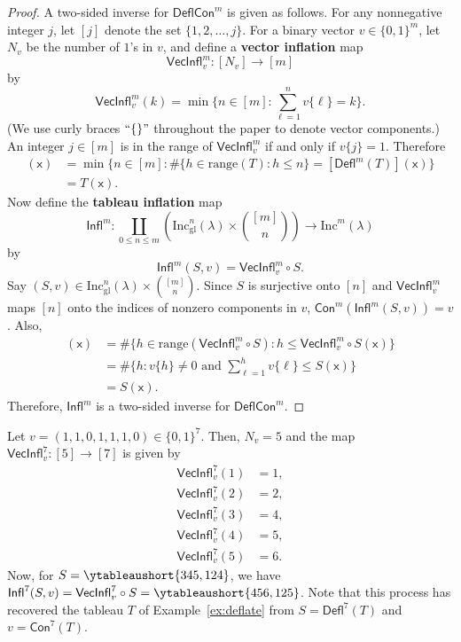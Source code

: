 \documentclass[12pt]{amsart}
\newcommand{\x}{\ensuremath{\mathsf{x}}}
\theoremstyle{definition}
\newenvironment{example}
  {\pushQED{\qed}\renewcommand{\qedsymbol}{$\diamondsuit$}\examplex}
  {\popQED\endexamplex}
\theoremstyle{remark}
\numberwithin{equation}{section}
\newcommand{\inc}{\ensuremath{\mathrm{Inc}}}
\newcommand{\incgl}{\inc_{\mathrm{gl}}}
\newcommand{\deflate}{\ensuremath{\mathsf{Defl}}}
\newcommand{\inflate}{\ensuremath{\mathsf{VecInfl}}}
\newcommand{\tinflate}{\ensuremath{\mathsf{Infl}}}
\newcommand{\content}{\ensuremath{\mathsf{Con}}}
\newcommand{\compress}{\ensuremath{\mathsf{DeflCon}}}
\begin{document}
\begin{proof}
A two-sided inverse for $\compress^m$ is given as follows. For any nonnegative integer $j$, let $[j]$ denote the set $\{1, 2, \dots, j\}$.
For a binary vector $v \in \{0,1\}^m$, let $N_v$ be the number of $1$'s in $v$, and define a {\bf vector inflation} map \[\inflate^m_v : [N_v] \to [m]\] by
\[ \inflate^m_v(k) = \min \bigg\lbrace n \in [m]:   \sum_{\ell = 1}^n v\lbrace \ell \rbrace = k \bigg\rbrace.\] (We use curly braces $``\{\}"$ throughout the paper to denote vector components.) An integer $j \in [m]$ is in the range of $\inflate^m_v$ if and only if $v\lbrace j \rbrace = 1$. Therefore
\begin{align*}
[\inflate^m_{\content^m(T)} \circ \deflate^m(T)](\x) &= \min \bigg\lbrace n \in [m]:    \# \{ h \in \mathrm{range}(T): h \leq n \} = [\deflate^m(T)](\x) \bigg\rbrace \\ &= T(\x). 
\end{align*} Now define the {\bf tableau inflation} map 
\[
\tinflate^m : \coprod_{0 \leq n \leq m} \left( \incgl^n(\lambda) \times \binom{[m]}{n} \right) \to \inc^m(\lambda)
\] 
by 
\[
\tinflate^m(S,v) = \inflate^m_v \circ S.
\]
Say $(S,v) \in \incgl^n(\lambda) \times \binom{[m]}{n}$. Since $S$ is surjective onto $[n]$ and $\inflate^m_v$ maps $[n]$ onto the indices of nonzero components in $v$, $\content^m (\tinflate^m(S,v)) = v$.  Also,
\begin{align*}
 [\deflate^m(\inflate^m_v  \circ S)](\x) &= \# \{ h \in \mathrm{range}(\inflate^m_v \circ S): h \leq \inflate^m_v \circ S(\x) \} \\  
 &= \# \{ h: v\{h\} \neq 0 \text{ and } \sum_{\ell = 1}^h v\{\ell\} \leq S(\x)  \} \\
 &= S(\x).
\end{align*}
Therefore, $\tinflate^m$ is a two-sided inverse for $\compress^m$.
\end{proof} 
\begin{example}\label{ex:reinflate}
Let $v = (1,1,0,1,1,1,0) \in \{0,1\}^7$. Then, $N_v = 5$ and the map $\inflate^7_v : [5] \to [7]$ is given by 
\begin{align*}
\inflate^7_v(1) &= 1, \\
\inflate^7_v(2) &= 2, \\
\inflate_v^7(3) &= 4, \\
\inflate_v^7(4) &= 5, \\
\inflate_v^7(5) &= 6. 
\end{align*}
Now, for $S = \ytableaushort{345,124}$, we have $\tinflate^7(S,v) = \inflate^7_v \circ S = \ytableaushort{456,125}$. Note that this process has recovered the tableau $T$ of Example~\ref{ex:deflate} from $S=\deflate^7(T)$ and $v=\content^7(T)$.
\end{example}
\end{document}
